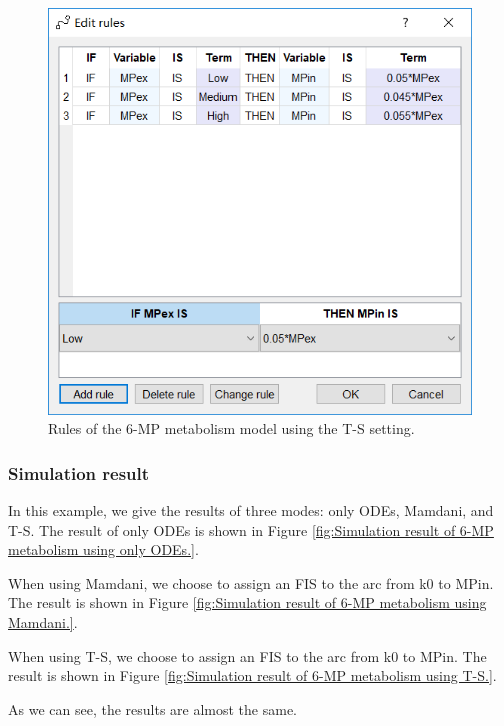 \documentclass[journal,a4paper,onecolumn]{article}
\begin{document}
\begin{figure}[!hbt]
	\begin{center}
		\includegraphics[width=\columnwidth]{fig60}
		\caption{Rules of the 6-MP metabolism model using the T-S setting.}
		\label{fig:Rules of 6-MP metabolism using T-S.}
	\end{center}
\end{figure}


\subsubsection{Simulation result}
In this example, we give the results of three modes: only ODEs, Mamdani, and T-S. The result of only ODEs is shown in Figure \ref{fig:Simulation result of 6-MP metabolism using only ODEs.}.

When using Mamdani, we choose to assign an FIS to the arc from k0 to MPin. The result is shown in Figure \ref{fig:Simulation result of 6-MP metabolism using Mamdani.}.

When using T-S, we choose to assign an FIS to the arc from k0 to MPin. The result is shown in Figure \ref{fig:Simulation result of 6-MP metabolism using T-S.}.

As we can see, the results are almost the same.
\end{document}
